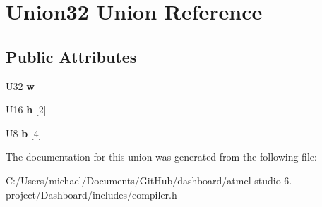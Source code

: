 \hypertarget{union_union32}{\section{Union32 Union Reference}
\label{union_union32}
}
\subsection*{Public Attributes}
\begin{DoxyCompactItemize}
\item 
\hypertarget{union_union32_a9de5c1d4630ae9bc4ae9e2a898fc1dd5}{U32 {\bfseries w}}\label{union_union32_a9de5c1d4630ae9bc4ae9e2a898fc1dd5}

\item 
\hypertarget{union_union32_aa06601ce86381bf4ed6b3796d826f59c}{U16 {\bfseries h} \mbox{[}2\mbox{]}}\label{union_union32_aa06601ce86381bf4ed6b3796d826f59c}

\item 
\hypertarget{union_union32_a049a383437edea909249ce837664fdae}{U8 {\bfseries b} \mbox{[}4\mbox{]}}\label{union_union32_a049a383437edea909249ce837664fdae}

\end{DoxyCompactItemize}


The documentation for this union was generated from the following file\-:\begin{DoxyCompactItemize}
\item 
C\-:/\-Users/michael/\-Documents/\-Git\-Hub/dashboard/atmel studio 6. project/\-Dashboard/includes/compiler.\-h\end{DoxyCompactItemize}
